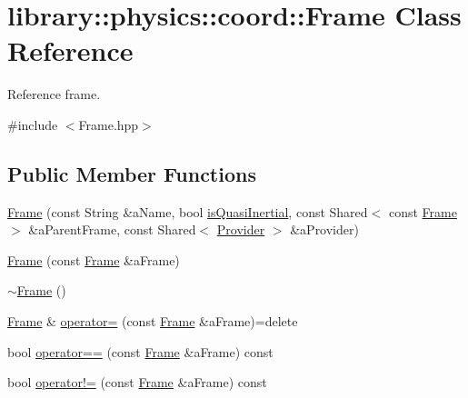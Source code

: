 \hypertarget{classlibrary_1_1physics_1_1coord_1_1_frame}{}\section{library\+:\+:physics\+:\+:coord\+:\+:Frame Class Reference}
\label{classlibrary_1_1physics_1_1coord_1_1_frame}


Reference frame.  




{\ttfamily \#include $<$Frame.\+hpp$>$}

\subsection*{Public Member Functions}
\begin{DoxyCompactItemize}
\item 
\hyperlink{classlibrary_1_1physics_1_1coord_1_1_frame_a53c1f8884a118492a3b024317c0ae0fd}{Frame} (const String \&a\+Name, bool \hyperlink{classlibrary_1_1physics_1_1coord_1_1_frame_a894d1ac6152e28dbb749058ca6ffd663}{is\+Quasi\+Inertial}, const Shared$<$ const \hyperlink{classlibrary_1_1physics_1_1coord_1_1_frame}{Frame} $>$ \&a\+Parent\+Frame, const Shared$<$ \hyperlink{classlibrary_1_1physics_1_1coord_1_1frame_1_1_provider}{Provider} $>$ \&a\+Provider)
\item 
\hyperlink{classlibrary_1_1physics_1_1coord_1_1_frame_ac375d8c787f92815af3b41e605264966}{Frame} (const \hyperlink{classlibrary_1_1physics_1_1coord_1_1_frame}{Frame} \&a\+Frame)
\item 
\hyperlink{classlibrary_1_1physics_1_1coord_1_1_frame_a7a4b031eff12e290c0ccacb7d5a47dfd}{$\sim$\+Frame} ()
\item 
\hyperlink{classlibrary_1_1physics_1_1coord_1_1_frame}{Frame} \& \hyperlink{classlibrary_1_1physics_1_1coord_1_1_frame_acd5cf67c12acb2ef5e95355fea262ca7}{operator=} (const \hyperlink{classlibrary_1_1physics_1_1coord_1_1_frame}{Frame} \&a\+Frame)=delete
\item 
bool \hyperlink{classlibrary_1_1physics_1_1coord_1_1_frame_a19c5c4ce3b1669a774980d9c3f18fe6c}{operator==} (const \hyperlink{classlibrary_1_1physics_1_1coord_1_1_frame}{Frame} \&a\+Frame) const
\item 
bool \hyperlink{classlibrary_1_1physics_1_1coord_1_1_frame_a2b3b046c3779b4281f14601302446169}{operator!=} (const \hyperlink{classlibrary_1_1physics_1_1coord_1_1_frame}{Frame} \&a\+Frame) const
\item 

\end{DoxyCompactItemize}
